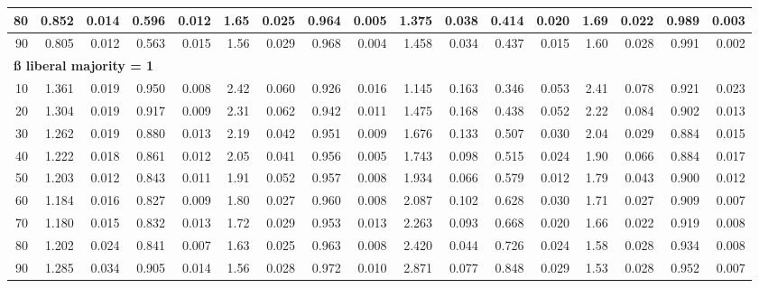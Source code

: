 \documentclass[
]{article}
\begin{document}
\begin{table}[H]
\begin{table}
{\begin{tabular}{r|r|r|r|r|r|r|r|r|r|r|r|r|r|r|r|r}
\hline
\hspace{1em}80 & 0.852 & 0.014 & 0.596 & 0.012 & 1.65 & 0.025 & 0.964 & 0.005 & 1.375 & 0.038 & 0.414 & 0.020 & 1.69 & 0.022 & 0.989 & 0.003\\
\hline
\hspace{1em}90 & 0.805 & 0.012 & 0.563 & 0.015 & 1.56 & 0.029 & 0.968 & 0.004 & 1.458 & 0.034 & 0.437 & 0.015 & 1.60 & 0.028 & 0.991 & 0.002\\
\hline
\multicolumn{17}{l}{\textbf{ß liberal majority = 1}}\\
\hline
\hspace{1em}10 & 1.361 & 0.019 & 0.950 & 0.008 & 2.42 & 0.060 & 0.926 & 0.016 & 1.145 & 0.163 & 0.346 & 0.053 & 2.41 & 0.078 & 0.921 & 0.023\\
\hline
\hspace{1em}20 & 1.304 & 0.019 & 0.917 & 0.009 & 2.31 & 0.062 & 0.942 & 0.011 & 1.475 & 0.168 & 0.438 & 0.052 & 2.22 & 0.084 & 0.902 & 0.013\\
\hline
\hspace{1em}30 & 1.262 & 0.019 & 0.880 & 0.013 & 2.19 & 0.042 & 0.951 & 0.009 & 1.676 & 0.133 & 0.507 & 0.030 & 2.04 & 0.029 & 0.884 & 0.015\\
\hline
\hspace{1em}40 & 1.222 & 0.018 & 0.861 & 0.012 & 2.05 & 0.041 & 0.956 & 0.005 & 1.743 & 0.098 & 0.515 & 0.024 & 1.90 & 0.066 & 0.884 & 0.017\\
\hline
\hspace{1em}50 & 1.203 & 0.012 & 0.843 & 0.011 & 1.91 & 0.052 & 0.957 & 0.008 & 1.934 & 0.066 & 0.579 & 0.012 & 1.79 & 0.043 & 0.900 & 0.012\\
\hline
\hspace{1em}60 & 1.184 & 0.016 & 0.827 & 0.009 & 1.80 & 0.027 & 0.960 & 0.008 & 2.087 & 0.102 & 0.628 & 0.030 & 1.71 & 0.027 & 0.909 & 0.007\\
\hline
\hspace{1em}70 & 1.180 & 0.015 & 0.832 & 0.013 & 1.72 & 0.029 & 0.953 & 0.013 & 2.263 & 0.093 & 0.668 & 0.020 & 1.66 & 0.022 & 0.919 & 0.008\\
\hline
\hspace{1em}80 & 1.202 & 0.024 & 0.841 & 0.007 & 1.63 & 0.025 & 0.963 & 0.008 & 2.420 & 0.044 & 0.726 & 0.024 & 1.58 & 0.028 & 0.934 & 0.008\\
\hline
\hspace{1em}90 & 1.285 & 0.034 & 0.905 & 0.014 & 1.56 & 0.028 & 0.972 & 0.010 & 2.871 & 0.077 & 0.848 & 0.029 & 1.53 & 0.028 & 0.952 & 0.007\\

\end{tabular}}
\end{table}
\end{table}
\end{document}
